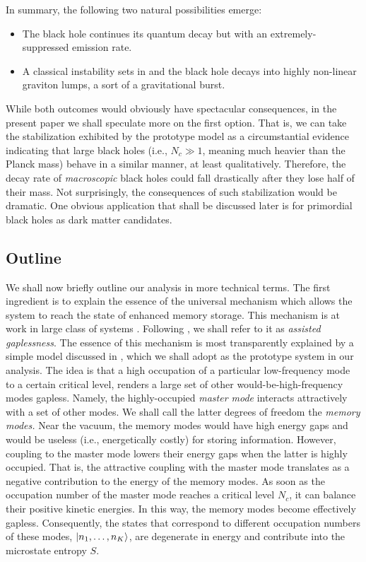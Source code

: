 \documentclass[aps,prd,reprint,superscriptaddress,nofootinbib]{revtex4-2}
\begin{document}
 
In summary, the following two natural possibilities emerge: 
 \begin{itemize}
  \item The black hole continues its quantum decay but with an  
  extremely-suppressed emission rate. 
  \item A classical instability sets in and the black hole
  decays into highly non-linear graviton lumps, a sort of a 
  gravitational burst. 
\end{itemize} 
 
 While both outcomes would obviously have spectacular consequences,  
 in the present paper we shall speculate more on the first option.
 That is,  we can take
 the stabilization exhibited by the prototype model as a circumstantial 
 evidence indicating that large black holes  (i.e., $N_c \gg 1$, meaning much heavier than the Planck mass)
 behave in a similar manner, at least qualitatively.  
  Therefore, the decay rate of {\it macroscopic} black holes 
 could fall drastically after they lose half of their mass.  
  Not surprisingly, the consequences of such stabilization would be 
 dramatic.  One obvious application that shall be 
 discussed later is for primordial black holes as dark matter candidates. 
  

\subsection{Outline}
 We shall now briefly outline our analysis in more 
 technical terms. 
The first ingredient is to explain the essence of the universal 
mechanism which allows the system to reach the state  
of enhanced memory storage. This mechanism is at work in  
large class of systems \cite{1207.4059, 1507.02948, 1507.08952, 1601.01329, 1711.09079,1801.03918,1712.02233,1805.10292, 1810.02336, 1812.08749}. 
Following \cite{1805.10292}, we shall refer to it as  \textit{assisted gaplessness}. 
 The essence of this mechanism  is most transparently explained by a simple model discussed in \cite{1711.09079,1801.03918,1712.02233, 1810.02336, 
1812.08749}, which we shall adopt as the prototype system in our analysis. 
The idea is that a high occupation of a particular low-frequency mode
to a certain critical level, 
renders a large set of other would-be-high-frequency modes gapless. 
 Namely, 
the highly-occupied \textit{master mode} interacts attractively with a set of other modes. We shall call the latter degrees of freedom the \textit{memory modes.}
Near the vacuum, the memory modes would have high energy gaps and would be useless (i.e., energetically costly) for storing information. 
However, coupling to the master mode lowers their energy gaps 
when the latter is highly occupied. That is, the attractive coupling with 
the master mode translates as a negative contribution to the energy of the memory modes. As soon as the occupation number of the master mode reaches a critical level $N_c$,
it can balance their positive kinetic energies. In this way, the memory modes become effectively gapless. Consequently, the states that correspond 
to different occupation numbers of these modes, 
$\ket{n_1,\ldots,n_K}$, are degenerate in energy
and contribute into the microstate entropy $S$. 
\end{document}
